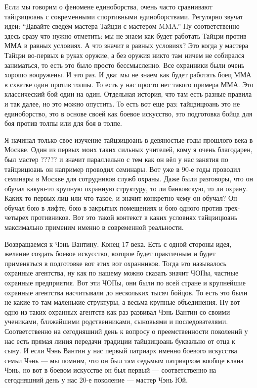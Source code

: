 Если мы 
говорим о феномене единоборства, очень часто сравнивают тайцзицюань с современными 
спортивными единоборствами. Регулярно звучат идеи: ``Давайте сведём мастера Тайцзи с мастером 
MMA.'' Ну соответственно здесь сразу что нужно отметить: мы не знаем как будет работать 
Тайцзи против ММА в равных условиях. А что значит в равных условиях? Это когда у мастера 
Тайцзи во-первых в руках оружие, а без оружия никто там ничем не собирался заниматься, то 
есть это было просто бессмысленно. Все охранники были очень хорошо вооружены. И это раз. И 
два: мы не знаем как будет работать боец ММА в схватке один против толпы. То есть у нас просто 
нет такого примера ММА. Это классический бой один на один. Отдельная история, что там есть 
разные правила и так далее, но это можно опустить. То есть вот еще раз: тайцзицюань это не 
единоборство, это в основе своей как боевое искусство, это подготовка бойца для боя против 
толпы или для боя в толпе.

Я начинал только свое изучение тайцзицюань в девяностые 
годы прошлого века в Москве. Один из первых моих таких сильных учителей, кому я очень 
благодарен, был мастер ????? и значит параллельно с тем как он вёл у нас занятия по
тайцзицюань он например проводил семинары. Вот уже в 90-е годы проводил семинары в Москве для 
сотрудников служб охраны. Даже были разговоры, что он обучал какую-то крупную охранную 
структуру, то ли банковскую, то ли охрану. Каких-то первых лиц или что такое, и значит конкретно 
чему он обучал? Он обучал бою в лифте, бою в закрытых помещениях и бою одного против 
трех-четырех противников. Вот это такой контекст в каких условиях тайцзицюань максимально 
применим именно в современной реальности.

Возвращаемся к 
Чэнь Вантину. Конец 17 века. Есть с одной стороны идея, желание создать боевое искусство, которое 
будет практичным и будет применяться в подготовке вот этих вот охранников. Тогда это 
называлось охранные агентства, ну как по нашему можно сказать значит ЧОПы, частные 
охранные предприятия. Вот эти ЧОПы, они были по всей стране и крупнейшие охранные агентства 
насчитывали до нескольких тысяч бойцов. То есть это были не какие-то там маленькие структуры, а
весьма крупные объединения. Ну вот одно из таких охранных агентств как раз развивал 
Чэнь Вантин со своими учениками, ближайшими родственниками, сыновьями и последователями.
Соответственно на сегодняшний день к вопросу о преемственности поколений у 
нас есть прямая линия передачи традиции тайцзицюань буквально от отца к сыну. И если Чэнь 
Вантин у нас первый патриарх именно боевого искусства семьи Чэнь --- мы помним, что он был там 
седьмым патриархом вообще клана Чэнь, но вот в боевом искусстве он был первый --- соответственно 
на сегодняшний день у нас 20-е поколение --- мастер Чэнь Юй.

